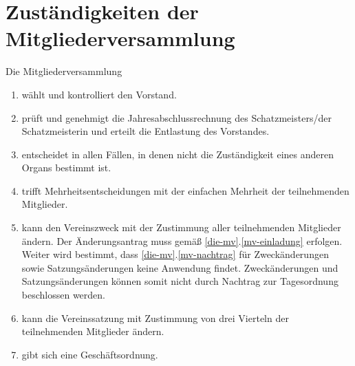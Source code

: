 \documentclass[a4paper, 12pt]{scrartcl}
\begin{document}
\section{Zuständigkeiten der Mitgliederversammlung}
Die Mitgliederversammlung
\begin{enumerate}
	\item wählt und kontrolliert den Vorstand.
	\item prüft und genehmigt die Jahresabschlussrechnung des Schatzmeisters/der Schatzmeisterin und erteilt die Entlastung des Vorstandes.
	\item entscheidet in allen Fällen, in denen nicht die Zuständigkeit eines anderen Organs bestimmt ist.
	\item trifft Mehrheitsentscheidungen mit der einfachen Mehrheit der teilnehmenden Mitglieder.
	\item kann den Vereinszweck mit der Zustimmung aller teilnehmenden
    Mitglieder ändern. Der Änderungsantrag muss gemäß
    \ref{die-mv}.\ref{mv-einladung} erfolgen. Weiter wird bestimmt, dass
    \ref{die-mv}.\ref{mv-nachtrag} für Zweckänderungen sowie
    Satzungsänderungen keine Anwendung findet. Zweckänderungen und
    Satzungsänderungen können somit nicht durch Nachtrag zur Tagesordnung beschlossen werden.
	\item kann die Vereinssatzung mit Zustimmung von drei Vierteln der teilnehmenden Mitglieder ändern. 
	\item gibt sich eine Geschäftsordnung.

\end{enumerate}
\end{document}
